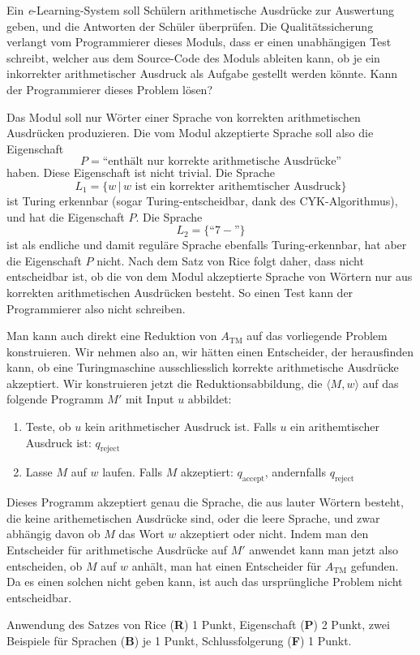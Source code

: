 Ein {\it e}-Learning-System soll Schülern arithmetische Ausdrücke
zur Auswertung geben, und die Antworten der Schüler überprüfen.
Die Qualitätssicherung verlangt vom Programmierer dieses Moduls, dass
er einen unabhängigen Test schreibt, welcher aus dem Source-Code
des Moduls ableiten kann, ob je ein inkorrekter arithmetischer Ausdruck
als Aufgabe gestellt werden könnte. Kann der Programmierer dieses
Problem lösen?

\begin{loesung}
Das Modul soll nur Wörter einer Sprache von korrekten arithmetischen
Ausdrücken produzieren.
Die vom Modul akzeptierte Sprache soll also die Eigenschaft
\[
P=\text{``enthält nur korrekte arithmetische Ausdrücke''}
\]
haben. 
Diese Eigenschaft ist nicht trivial. Die Sprache
\[
L_1=\{w\,|\,\text{$w$ ist ein korrekter arithemtischer Ausdruck}\}
\]
ist Turing erkennbar (sogar Turing-entscheidbar, dank des CYK-Algorithmus),
und hat die Eigenschaft $P$.
Die Sprache
\[
L_2=\{ \text{``$7-$''}\}
\]
ist als endliche und damit reguläre Sprache ebenfalls Turing-erkennbar,
hat aber die Eigenschaft $P$ nicht. Nach dem Satz von Rice folgt daher,
dass nicht entscheidbar ist, ob die von dem Modul akzeptierte Sprache
von Wörtern nur aus korrekten arithmetischen Ausdrücken besteht.
So einen Test kann der Programmierer also nicht schreiben.
\end{loesung}

\begin{loesung}
Man kann auch direkt eine Reduktion von $A_{\text{TM}}$ auf das vorliegende
Problem konstruieren.  Wir nehmen also an, wir hätten einen Entscheider,
der herausfinden kann, ob eine Turingmaschine ausschliesslich korrekte
arithmetische Ausdrücke akzeptiert. Wir konstruieren jetzt die
Reduktionsabbildung, die $\langle M,w\rangle$ auf das folgende
Programm $M'$ mit Input $u$ abbildet:
\begin{enumerate}
\item Teste, ob $u$ kein arithmetischer Ausdruck ist. Falls 
$u$ ein arithemtischer Ausdruck ist: $q_\text{reject}$
\item Lasse $M$ auf $w$ laufen. Falls $M$ akzeptiert: $q_\text{accept}$,
andernfalls $q_\text{reject}$
\end{enumerate}
Dieses Programm akzeptiert genau die Sprache, die aus lauter Wörtern
besteht, die keine arithemetischen Ausdrücke sind, oder die leere
Sprache, und zwar abhängig davon ob $M$ das Wort $w$ akzeptiert
oder nicht. Indem man den Entscheider für arithmetische Ausdrücke
auf $M'$ anwendet kann man jetzt also entscheiden, ob $M$ auf $w$
anhält, man hat einen Entscheider für $A_\text{TM}$ gefunden.
Da es einen solchen nicht geben kann, ist auch das ursprüngliche
Problem nicht entscheidbar.
\end{loesung}

\begin{bewertung}
Anwendung des Satzes von Rice ({\bf R}) 1 Punkt,
Eigenschaft ({\bf P}) 2 Punkt,
zwei Beispiele für Sprachen ({\bf B}) je 1 Punkt,
Schlussfolgerung ({\bf F}) 1 Punkt.
\end{bewertung}
